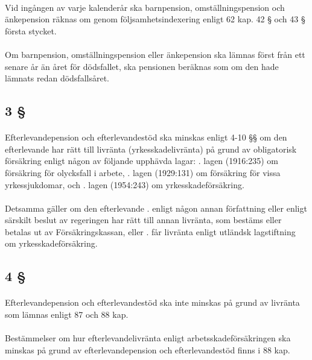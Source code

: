 \documentclass[a4paper,notitlepage,openany,10pt]{book}
\begin{document}
\paragraph*{}
Vid ingången av varje kalenderår ska barnpension, omställningspension och änkepension räknas om genom följsamhetsindexering enligt 62 kap. 42 § och 43 § första stycket.
\paragraph*{}
Om barnpension, omställningspension eller änkepension ska lämnas först från ett senare år än året för dödsfallet, ska pensionen beräknas som om den hade lämnats redan dödsfallsåret.
\subsection*{3 §}
\paragraph*{}
Efterlevandepension och efterlevandestöd ska minskas enligt 4-10 §§ om den efterlevande har rätt till livränta (yrkesskadelivränta) på grund av obligatorisk försäkring enligt någon av följande upphävda lagar:
. lagen (1916:235) om försäkring för olycksfall i arbete,
. lagen (1929:131) om försäkring för vissa yrkessjukdomar, och
. lagen (1954:243) om yrkesskadeförsäkring.
\paragraph*{}
Detsamma gäller om den efterlevande
. enligt någon annan författning eller enligt särskilt beslut av regeringen har rätt till annan livränta, som bestäms eller betalas ut av Försäkringskassan, eller
. får livränta enligt utländsk lagstiftning om yrkesskadeförsäkring.
\subsection*{4 §}
\paragraph*{}
Efterlevandepension och efterlevandestöd ska inte minskas på grund av livränta som lämnas enligt 87 och 88 kap.
\paragraph*{}
Bestämmelser om hur efterlevandelivränta enligt arbetsskadeförsäkringen ska minskas på grund av efterlevandepension och efterlevandestöd finns i 88 kap.
\end{document}
